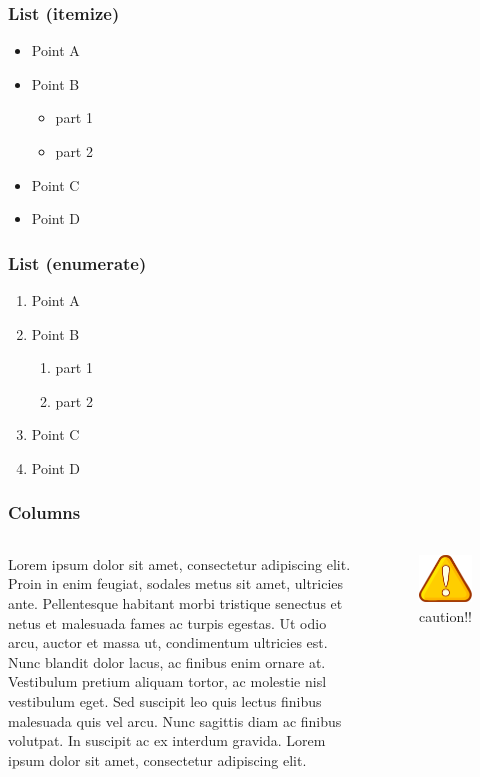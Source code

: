 \documentclass[t 9pt]{beamer}
\begin{document}
    \begin{frame}
        \frametitle{List (itemize)}
        \begin{itemize}
            \item Point A
            \item Point B
            \begin{itemize}
                \item part 1
                \item part 2
            \end{itemize}
            \item Point C
            \item Point D
        \end{itemize}
    \end{frame}

    \begin{frame}
        \frametitle{List (enumerate)}
        \begin{enumerate}
            \item Point A
            \item Point B
            \begin{enumerate}
                \item part 1
                \item part 2
            \end{enumerate}
            \item Point C
            \item Point D
        \end{enumerate}
    \end{frame}

    \begin{frame}
        \frametitle{Columns}
        \begin{columns}
        Lorem ipsum dolor sit amet, consectetur adipiscing elit. Proin in enim feugiat, sodales metus sit amet, ultricies ante. Pellentesque habitant morbi tristique senectus et netus et malesuada fames ac turpis egestas. Ut odio arcu, auctor et massa ut, condimentum ultricies est. Nunc blandit dolor lacus, ac finibus enim ornare at. Vestibulum pretium aliquam tortor, ac molestie nisl vestibulum eget. Sed suscipit leo quis lectus finibus malesuada quis vel arcu. Nunc sagittis diam ac finibus volutpat. In suscipit ac ex interdum gravida.
        Lorem ipsum dolor sit amet, consectetur adipiscing elit.
        \begin{figure}
            \includegraphics[scale=0.5]{caution.pdf}
            \caption{caution!!}
            \end{figure}
        \end{columns}
    \end{frame}
\end{document}
